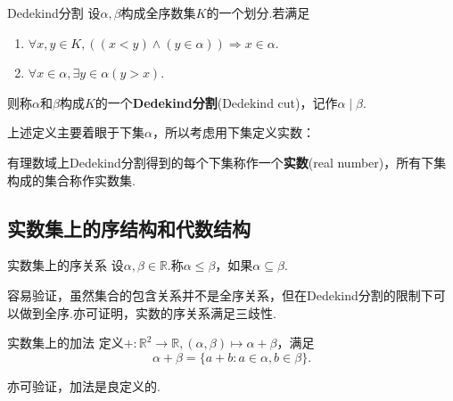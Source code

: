 \documentclass[lang=cn, zihao=5]{elegantbook}
\newcommand{\R}{\mathbb{R}}
\begin{document}
\begin{definition}{Dedekind分割}
	设$\alpha ,\beta$构成全序数集$K$的一个划分.若满足
	\begin{enumerate}
		\item $\forall x,y \in K,((x < y) \wedge (y \in \alpha)) \Rightarrow x \in \alpha$.
		\item $\forall x \in \alpha ,\exists y \in \alpha (y>x)$.
	\end{enumerate}
	则称$\alpha$和$\beta$构成$K$的一个\textbf{Dedekind分割}(Dedekind cut)，记作$\alpha \mid \beta$.
\end{definition}

上述定义主要着眼于下集$\alpha$，所以考虑用下集定义实数：

\begin{definition}
	有理数域上Dedekind分割得到的每个下集称作一个\textbf{实数}(real number)，所有下集构成的集合称作实数集.
\end{definition}

\subsection{实数集上的序结构和代数结构}

\begin{definition}{实数集上的序关系}
	设$\alpha ,\beta \in \R$.称$\alpha \leq \beta$，如果$\alpha \subseteq \beta$.
\end{definition}

容易验证，虽然集合的包含关系并不是全序关系，但在Dedekind分割的限制下可以做到全序.亦可证明，实数的序关系满足三歧性.

\begin{definition}{实数集上的加法}
	定义$+:\R ^2 \to \R ,(\alpha ,\beta) \mapsto \alpha + \beta$，满足$$\alpha + \beta = \{ a+b:a \in \alpha ,b \in \beta \}.$$
\end{definition}

亦可验证，加法是良定义的.
\end{document}
